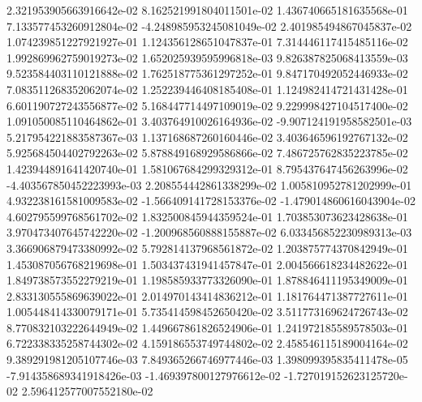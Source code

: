 2.321953905663916642e-02	8.162521991804011501e-02	1.436740665181635568e-01	7.133577453260912804e-02	-4.248985953245081049e-02	2.401985494867045837e-02	1.074239851227921927e-01	1.124356128651047837e-01	7.314446117415485116e-02	1.992869962759019273e-02	1.652025939595996818e-03	9.826387825068413559e-03	9.523584403110121888e-02	1.762518775361297252e-01	9.847170492052446933e-02	7.083511268352062074e-02	1.252239446408185408e-01	1.124982414721431428e-01	6.601190727243556877e-02	5.168447714497109019e-02	9.229998427104517400e-02	1.091050085110464862e-01	3.403764910026164936e-02	-9.907124191958582501e-03	5.217954221883587367e-03	1.137168687260160446e-02	3.403646596192767132e-02	5.925684504402792263e-02	5.878849168929586866e-02	7.486725762835223785e-02	1.423944891641420740e-01	1.581067684299329312e-01	8.795437647456263996e-02	-4.403567850452223993e-03	2.208554442861338299e-02	1.005810952781202999e-01	4.932238161581009583e-02	-1.566409141728153376e-02	-1.479014860616043904e-02	4.602795599768561702e-02	1.832500845944359524e-01	1.703853073623428638e-01	3.970473407645742220e-02	-1.200968560888155887e-02	6.033456852230989313e-03	3.366906879473380992e-02	5.792814137968561872e-02	1.203875774370842949e-01	1.453087056768219698e-01	1.503437431941457847e-01	2.004566618234482622e-01	1.849738573552279219e-01	1.198585933773326090e-01	1.878846411195349009e-01	2.833130555869639022e-01	2.014970143414836212e-01	1.181764471387727611e-01	1.005448414330079171e-01	5.735414598452650420e-02	3.511773169624726743e-02	8.770832103222644949e-02	1.449667861826524906e-01	1.241972185589578503e-01	6.722338335258744302e-02	4.159186553749744802e-02	2.458546115189004164e-02	9.389291981205107746e-03	7.849365266746977446e-03	1.398099395835411478e-05	-7.914358689341918426e-03	-1.469397800127976612e-02	-1.727019152623125720e-02	2.596412577007552180e-02
